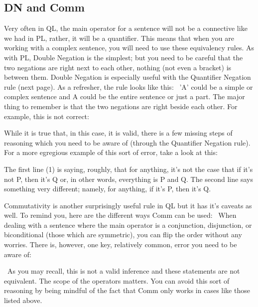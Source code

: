 \subsection{DN and Comm}

Very often in QL, the main operator for a sentence will not be a connective like we had in PL, rather, it will be a quantifier. This means that when you are working with a complex sentence, you will need to use these equivalency rules. As with PL, Double Negation is the simplest; but you need to be careful that the two negations are right next to each other, nothing (not even a bracket) is between them. Double Negation is especially useful with the Quantifier Negation rule (next page). As a refresher, the rule looks like this: 
'A' could be a simple or complex sentence and A could be the entire sentence or just a part. The major thing to remember is that the two negations are right beside each other. For example, this is not correct:
\begin{fitchproof}
\end{fitchproof}
While it is true that, in this case, it is valid, there is a few missing steps of reasoning which you need to be aware of (through the Quantifier Negation rule). For a more egregious example of this sort of error, take a look at this: 
\begin{fitchproof}
\end{fitchproof}

The first line (1) is saying, roughly, that for anything, it's not the case that if it's not P, then it's Q or, in other words, everything is P and Q. The second line says something very different; namely, for anything, if it's P, then it's Q. 

Commutativity is another surprisingly useful rule in QL but it has it's caveats as well. To remind you, here are the different ways Comm can be used: 
When dealing with a sentence where the main operator is a conjunction, disjunction, or biconditional (those which are symmetric), you can flip the order without any worries. There is, however, one key, relatively common, error you need to be aware of:
\begin{fitchproof}
\end{fitchproof}
 As you may recall, this is not a valid inference and these statements are not equivalent. The scope of the operators matters. You can avoid this sort of reasoning by being mindful of the fact that Comm only works in cases like those listed above. 

